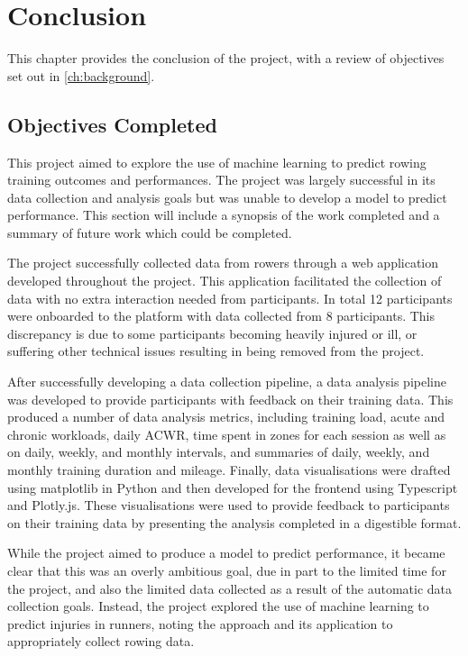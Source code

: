 \chapter{Conclusion}
This chapter provides the conclusion of the project, with a review of objectives set out in \ref{ch:background}.


\section{Objectives Completed}
This project aimed to explore the use of machine learning to predict rowing training outcomes and performances. The project was largely successful in its data collection and analysis goals but was unable to develop a model to predict performance. This section will include a synopsis of the work completed and a summary of future work which could be completed. 

The project successfully collected data from rowers through a web application developed throughout the project. This application facilitated the collection of data with no extra interaction needed from participants. In total 12 participants were onboarded to the platform with data collected from 8 participants. This discrepancy is due to some participants becoming heavily injured or ill, or suffering other technical issues resulting in being removed from the project. 

After successfully developing a data collection pipeline, a data analysis pipeline was developed to provide participants with feedback on their training data. This produced a number of data analysis metrics, including training load, acute and chronic workloads, daily ACWR, time spent in zones for each session as well as on daily, weekly, and monthly intervals, and summaries of daily, weekly, and monthly training duration and mileage. Finally, data visualisations were drafted using matplotlib in Python and then developed for the frontend using Typescript and Plotly.js. These visualisations were used to provide feedback to participants on their training data by presenting the analysis completed in a digestible format.

While the project aimed to produce a model to predict performance, it became clear that this was an overly ambitious goal, due in part to the limited time for the project, and also the limited data collected as a result of the automatic data collection goals. Instead, the project explored the use of machine learning to predict injuries in runners, noting the approach and its application to appropriately collect rowing data.


